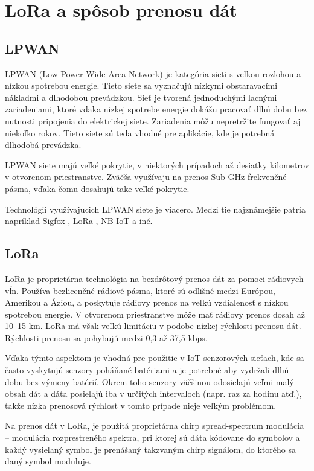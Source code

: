\documentclass[slovak,master]{diploma}
\begin{document}
\chapter{LoRa a spôsob prenosu dát}
\section {LPWAN}
LPWAN (Low Power Wide Area Network) je kategória sieti s veľkou rozlohou a nízkou spotrebou energie. Tieto siete sa vyznačujú nízkymi obstaravacími 
nákladmi a dlhodobou prevádzkou. Sieť je tvorená jednoduchými lacnými zariadeniami, ktoré vďaka nizkej spotrebe energie dokážu pracovať dlhú dobu bez 
nutnosti pripojenia do elektrickej siete. Zariadenia môžu nepretržite fungovať aj niekoľko rokov. 
Tieto siete sú teda vhodné pre aplikácie, kde je potrebná dlhodobá prevádzka.

LPWAN siete majú veľké pokrytie, v niektorých prípadoch až desiatky kilometrov v otvorenom priestranstve. Zväčša využívaju na prenos 
Sub-GHz frekvenčné pásma, vďaka čomu dosahujú take veľké pokrytie.

Technológii využívajucich LPWAN siete je viacero. Medzi tie najznámejšie patria napríklad Sigfox \cite{sigfox}, LoRa \cite{lora}, NB-IoT a iné.

\section {LoRa}
LoRa je proprietárna technológia na bezdrôtový prenos dát za pomoci rádiovych vĺn.
Používa bezlicenčné rádiové pásma, ktoré sú odlišné medzi Európou, Amerikou a Áziou, a poskytuje rádiovy prenos na veľkú vzdialenosť s nízkou spotrebou energie.
V otvorenom priestranstve môže mať rádiovy prenos dosah až 10--15 km. LoRa má však veľkú limitáciu v podobe nízkej rýchlosti prenosu dát.
Rýchlosti prenosu sa pohybujú medzi 0,3 až 37,5 kbps. %

Vďaka týmto aspektom je vhodná pre použitie v IoT senzorových sieťach, kde sa často vyskytujú senzory poháňané batériami a je potrebné aby vydržali dlhú dobu 
bez výmeny batérií. Okrem toho senzory väčšinou odosielajú veľmi malý obsah dát a dáta posielajú iba v určitých intervaloch (napr. raz za hodinu atď.), 
takže nízka prenosová rýchlosť v tomto prípade nieje veľkým problémom.

Na prenos dát v LoRa, je použitá proprietárna chirp spread-spectrum modulácia -- modulácia rozprestreného spektra, pri ktorej sú dáta kódovane do symbolov 
a každý vysielaný symbol je prenášaný takzvaným chirp signálom, do ktorého sa daný symbol moduluje.
\end{document}
